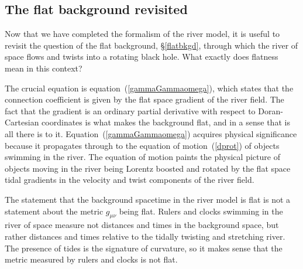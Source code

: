 \documentclass[twocolumn,showpacs,preprintnumbers,amsmath,amssymb,prb]{revtex4}
\begin{document}
%
%

\subsection{The flat background revisited}
\label{flatbkgdre}

Now that we have completed the formalism of the river model,
it is useful to revisit the question of the flat background, \S\ref{flatbkgd},
through which the river of space flows and twists into a rotating black hole.
What exactly does flatness mean in this context?

The crucial equation is equation~(\ref{gammaGammaomega}),
which states that the connection coefficient is given by the flat space
gradient of the river field.
The fact that the gradient is an ordinary partial derivative
with respect to Doran-Cartesian coordinates
is what makes the background flat,
and in a sense that is all there is to it.
Equation~(\ref{gammaGammaomega})
acquires physical significance because it
propagates through to the equation of motion~(\ref{dprot})
of objects swimming in the river.
The equation of motion paints the physical picture
of objects moving in the river being Lorentz boosted and rotated
by the flat space tidal gradients in the velocity and twist components
of the river field.

The statement that the background spacetime in the river model is flat
is not a statement about the metric $g_{\mu\nu}$ being flat.
Rulers and clocks swimming in the river of space measure
not distances and times in the background space,
but rather distances and times
relative to the tidally twisting and stretching river.
The presence of tides is the signature of curvature,
so it makes sense that the metric measured by rulers and clocks is not flat.
\end{document}

